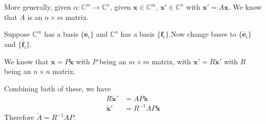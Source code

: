 \documentclass[a4paper]{article}
\theoremstyle{definition}
\newcommand{\mb}[1]{\mathbf{#1}}
\newcommand{\C}{\mathbb{C}}
\begin{document}
More generally, given $\alpha: \C^m \to \C^n$, given $\mb{x}\in \C^m$, $\mb{x}'\in \C^n$ with $\mb{x}' = A\mb{x}$. We know that $A$ is an $n\times m$ matrix.

Suppose $\C^m$ has a basis $\{\mb{e}_i\}$ and $\C^n$ has a basis $\{\mb{f}_i\}$.Now change bases to $\{\tilde{\mb{e}_i}\}$ and $\{\tilde{\mb{f}_i}\}$.

We know that $\mb{x} = P\mb{\tilde{x}}$ with $P$ being an $m\times m$ matrix, with $\mb{x}' = R\tilde{\mb{x}}'$ with $R$ being an $n\times n$ matrix.

Combining both of these, we have
\begin{align*}
  R\tilde{\mb{x}}' &= AP\tilde{\mb{x}}\\
  \tilde{\mb{x}}' &= R^{-1}AP\mb{\tilde{x}}
\end{align*}
Therefore $\tilde{A} = R^{-1}AP$.
\end{document}
